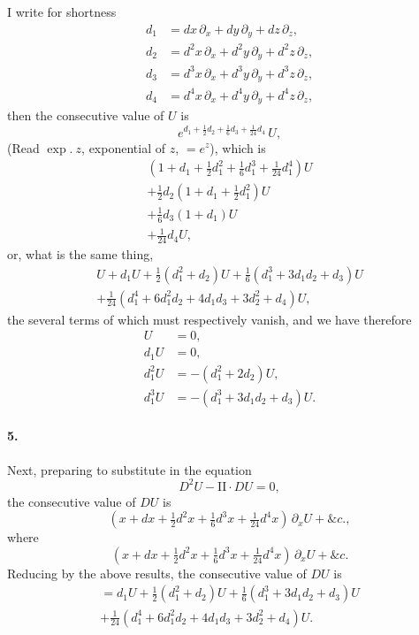 \documentclass[12pt,a4paper]{article}
\theoremstyle{plain}
\begin{document}
I  write  for  shortness
\begin{align*}
d_1 &= dx\, \partial_x + dy\, \partial_y + dz\, \partial_z, \\
d_2 &= d^2x\, \partial_x + d^2y\, \partial_y + d^2z\, \partial_z, \\
d_3 &= d^3x\, \partial_x + d^3y\, \partial_y + d^3z\, \partial_z, \\
d_4 &= d^4x\, \partial_x + d^4y\, \partial_y + d^4z\, \partial_z,
\end{align*}
then  the  consecutive  value  of  $U$  is
\[
e^{d_1 + \frac{1}{2}d_2 + \frac{1}{6}d_3 + \frac{1}{24}d_4} \, U,
\]
(Read  $\exp.\ z$,  exponential  of  $z$,  $= e^z$),  which  is
\begin{multline*}
\left(1 + d_1 + \tfrac{1}{2}d_1^2 + \tfrac{1}{6}d_1^3 + \tfrac{1}{24}d_1^4\right) U \\
+ \tfrac{1}{2}d_2 \left(1 + d_1 + \tfrac{1}{2}d_1^2\right) U \\
+ \tfrac{1}{6}d_3 (1 + d_1) U \\
+ \tfrac{1}{24}d_4 U,
\end{multline*}
or,  what  is  the  same  thing,
\begin{multline*}
U + d_1 U + \tfrac{1}{2}(d_1^2 + d_2) U + \tfrac{1}{6}(d_1^3 + 3d_1 d_2 + d_3) U \\
+ \tfrac{1}{24}(d_1^4 + 6d_1^2 d_2 + 4d_1 d_3 + 3d_2^2 + d_4) U,
\end{multline*}
the  several  terms  of  which  must  respectively  vanish,  and  we  have  therefore
\begin{align*}
U &= 0, \\
d_1 U &= 0, \\
d_1^2 U &= -(d_1^2 + 2d_2) U, \\
d_1^3 U &= -(d_1^3 + 3d_1 d_2 + d_3) U.
\end{align*}

\paragraph{5.}
Next,  preparing  to  substitute  in  the  equation
\[
D^2 U - \mathrm{II} \cdot DU = 0,
\]
the  consecutive  value  of  $DU$  is
\[
(x + dx + \tfrac{1}{2}d^2x + \tfrac{1}{6}d^3x + \tfrac{1}{24}d^4x) \, \partial_x U + \&c.,
\]
where
\[
(x + dx + \tfrac{1}{2}d^2x + \tfrac{1}{6}d^3x + \tfrac{1}{24}d^4x) \, \partial_x U + \&c.
\]
Reducing  by  the  above  results,  the  consecutive  value  of  $DU$  is
\begin{multline*}
= d_1 U + \tfrac{1}{2}(d_1^2 + d_2) U + \tfrac{1}{6}(d_1^3 + 3d_1 d_2 + d_3) U \\
+ \tfrac{1}{24}(d_1^4 + 6d_1^2 d_2 + 4d_1 d_3 + 3d_2^2 + d_4) U.
\end{multline*}
\end{document}
